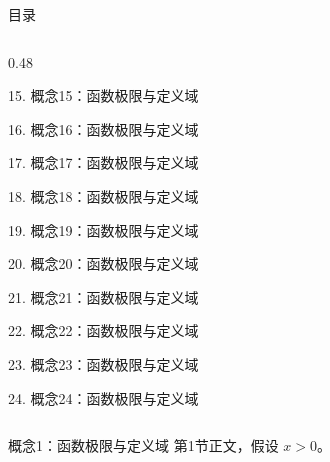 \documentclass[aspectratio=169,10pt,fontset=fandol]{ctexbeamer}
\begin{document}
\begin{frame}[t,fragile]{目录}
\begin{columns}[T,onlytextwidth]
\begin{column}{0.48\textwidth}
{\color{gray!40}\small 15. 概念15：函数极限与定义域\par}\vspace{0.22em}
{\color{gray!40}\small 16. 概念16：函数极限与定义域\par}\vspace{0.22em}
{\color{gray!40}\small 17. 概念17：函数极限与定义域\par}\vspace{0.22em}
{\color{gray!40}\small 18. 概念18：函数极限与定义域\par}\vspace{0.22em}
{\color{gray!40}\small 19. 概念19：函数极限与定义域\par}\vspace{0.22em}
{\color{gray!40}\small 20. 概念20：函数极限与定义域\par}\vspace{0.22em}
{\color{gray!40}\small 21. 概念21：函数极限与定义域\par}\vspace{0.22em}
{\color{gray!40}\small 22. 概念22：函数极限与定义域\par}\vspace{0.22em}
{\color{gray!40}\small 23. 概念23：函数极限与定义域\par}\vspace{0.22em}
{\color{gray!40}\small 24. 概念24：函数极限与定义域\par}\vspace{0.22em}
\end{column}
\end{columns}
\end{frame}
\begin{frame}[t,fragile]{概念1：函数极限与定义域}
\normalsize
{\normalsize
第1节正文，假设 $x>0$。
}
\end{frame}
\end{document}
